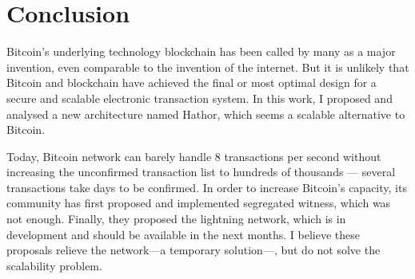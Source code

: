 



\chapter{Conclusion}

Bitcoin's underlying technology blockchain has been called by many as a major invention, even comparable to the invention of the internet. But it is unlikely that Bitcoin and blockchain have achieved the final or most optimal design for a secure and scalable electronic transaction system. In this work, I proposed and analysed a new architecture named Hathor, which seems a scalable alternative to Bitcoin.

Today, Bitcoin network can barely handle 8 transactions per second without increasing the unconfirmed transaction list to hundreds of thousands --- several transactions take days to be confirmed. In order to increase Bitcoin's capacity, its community has first proposed and implemented segregated witness, which was not enough. Finally, they proposed the lightning network, which is in development and should be available in the next months. I believe these proposals relieve the network---a temporary solution---, but do not solve the scalability problem.


